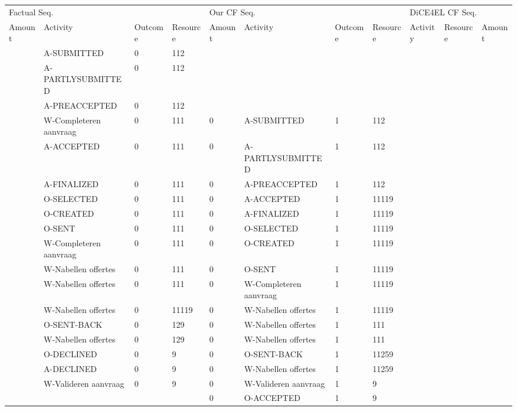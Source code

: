 \begin{tabular}{lllllllllll}
\toprule
\multicolumn{4}{l}{Factual Seq.} & \multicolumn{4}{l}{Our CF Seq.} & \multicolumn{3}{l}{DiCE4EL CF Seq.} \\
Amount & Activity & Outcome & Resource & Amount & Activity & Outcome & Resource & Activity & Resource & Amount \\
\midrule
 & A-SUBMITTED & 0 & 112 &  &  &  &  &  &  &  \\
 & A-PARTLYSUBMITTED & 0 & 112 &  &  &  &  &  &  &  \\
 & A-PREACCEPTED & 0 & 112 &  &  &  &  &  &  &  \\
 & W-Completeren aanvraag & 0 & 111 & 0 & A-SUBMITTED & 1 & 112 &  &  &  \\
 & A-ACCEPTED & 0 & 111 & 0 & A-PARTLYSUBMITTED & 1 & 112 &  &  &  \\
 & A-FINALIZED & 0 & 111 & 0 & A-PREACCEPTED & 1 & 112 &  &  &  \\
 & O-SELECTED & 0 & 111 & 0 & A-ACCEPTED & 1 & 11119 &  &  &  \\
 & O-CREATED & 0 & 111 & 0 & A-FINALIZED & 1 & 11119 &  &  &  \\
 & O-SENT & 0 & 111 & 0 & O-SELECTED & 1 & 11119 &  &  &  \\
 & W-Completeren aanvraag & 0 & 111 & 0 & O-CREATED & 1 & 11119 &  &  &  \\
 & W-Nabellen offertes & 0 & 111 & 0 & O-SENT & 1 & 11119 &  &  &  \\
 & W-Nabellen offertes & 0 & 111 & 0 & W-Completeren aanvraag & 1 & 11119 &  &  &  \\
 & W-Nabellen offertes & 0 & 11119 & 0 & W-Nabellen offertes & 1 & 11119 &  &  &  \\
 & O-SENT-BACK & 0 & 129 & 0 & W-Nabellen offertes & 1 & 111 &  &  &  \\
 & W-Nabellen offertes & 0 & 129 & 0 & W-Nabellen offertes & 1 & 111 &  &  &  \\
 & O-DECLINED & 0 & 9 & 0 & O-SENT-BACK & 1 & 11259 &  &  &  \\
 & A-DECLINED & 0 & 9 & 0 & W-Nabellen offertes & 1 & 11259 &  &  &  \\
 & W-Valideren aanvraag & 0 & 9 & 0 & W-Valideren aanvraag & 1 & 9 &  &  &  \\
 &  &  &  & 0 & O-ACCEPTED & 1 & 9 &  &  &  \\
\bottomrule
\end{tabular}
